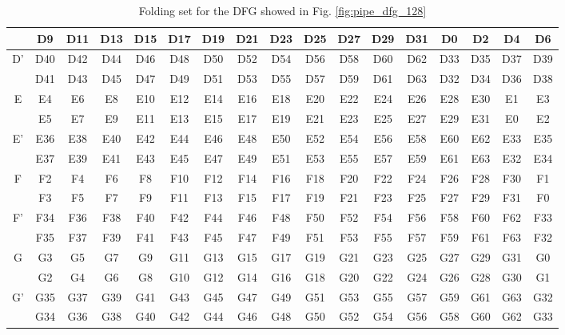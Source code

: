 \documentclass[journal,comsoc]{IEEEtran}
\begin{document}
\begin{table}[htbp]
\begin{threeparttable}
\begin{tabular}{|c||cccccccccccccccc|}
   & D9 & D11 & D13 & D15 & D17 & D19 & D21 & D23 & D25 & D27 & D29 & D31 & D0 & D2 & D4 & D6 \\  
\hline
  \multirow{2}{*}{D'} & D40 & D42 & D44 & D46 & D48 & D50 & D52 & D54 & D56 & D58 & D60 & D62 & D33 & D35 & D37 & D39 \\  

   & D41 & D43 & D45 & D47 & D49 & D51 & D53 & D55 & D57 & D59 & D61 & D63 & D32 & D34 & D36 & D38 \\  
\hline
  \multirow{2}{*}{E} & E4 & E6 & E8 & E10 & E12 & E14 & E16 & E18 & E20 & E22 & E24 & E26 & E28 & E30 & E1 & E3 \\  

   & E5 & E7 & E9 & E11 & E13 & E15 & E17 & E19 & E21 & E23 & E25 & E27 & E29 & E31 & E0 & E2 \\  
\hline
  \multirow{2}{*}{E'} & E36 & E38 & E40 & E42 & E44 & E46 & E48 & E50 & E52 & E54 & E56 & E58 & E60 & E62 & E33 & E35 \\  

   & E37 & E39 & E41 & E43 & E45 & E47 & E49 & E51 & E53 & E55 & E57 & E59 & E61 & E63 & E32 & E34 \\  
\hline
  \multirow{2}{*}{F} & F2 & F4 & F6 & F8 & F10 & F12 & F14 & F16 & F18 & F20 & F22 & F24 & F26 & F28 & F30 & F1 \\  

   & F3 & F5 & F7 & F9 & F11 & F13 & F15 & F17 & F19 & F21 & F23 & F25 & F27 & F29 & F31 & F0 \\  
\hline
  \multirow{2}{*}{F'} & F34 & F36 & F38 & F40 & F42 & F44 & F46 & F48 & F50 & F52 & F54 & F56 & F58 & F60 & F62 & F33 \\  

   & F35 & F37 & F39 & F41 & F43 & F45 & F47 & F49 & F51 & F53 & F55 & F57 & F59 & F61 & F63 & F32 \\  
\hline
  \multirow{2}{*}{G} & G3 & G5 & G7 & G9 & G11 & G13 & G15 & G17 & G19 & G21 & G23 & G25 & G27 & G29 & G31 & G0 \\  

   & G2 & G4 & G6 & G8 & G10 & G12 & G14 & G16 & G18 & G20 & G22 & G24 & G26 & G28 & G30 & G1 \\  
\hline
  \multirow{2}{*}{G'} & G35 & G37 & G39 & G41 & G43 & G45 & G47 & G49 & G51 & G53 & G55 & G57 & G59 & G61 & G63 & G32 \\  

   & G34 & G36 & G38 & G40 & G42 & G44 & G46 & G48 & G50 & G52 & G54 & G56 & G58 & G60 & G62 & G33 \\
\hline
\end{tabular}
\end{threeparttable}
\caption{Folding set for the DFG showed in Fig. \ref{fig:pipe_dfg_128}}
\label{tab:fold_set_128}
\end{table}
\end{document}
